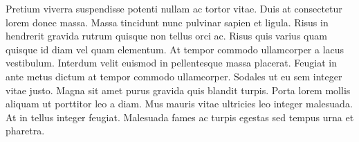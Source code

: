 \documentclass[12pt]{article}
\begin{document}
	Pretium viverra suspendisse potenti nullam ac tortor vitae. Duis at consectetur lorem donec massa. Massa tincidunt nunc pulvinar sapien et ligula. Risus in hendrerit gravida rutrum quisque non tellus orci ac. Risus quis varius quam quisque id diam vel quam elementum. At tempor commodo ullamcorper a lacus vestibulum. Interdum velit euismod in pellentesque massa placerat. Feugiat in ante metus dictum at tempor commodo ullamcorper. Sodales ut eu sem integer vitae justo. Magna sit amet purus gravida quis blandit turpis. Porta lorem mollis aliquam ut porttitor leo a diam. Mus mauris vitae ultricies leo integer malesuada. At in tellus integer feugiat. Malesuada fames ac turpis egestas sed tempus urna et pharetra.

	
\end{document}
